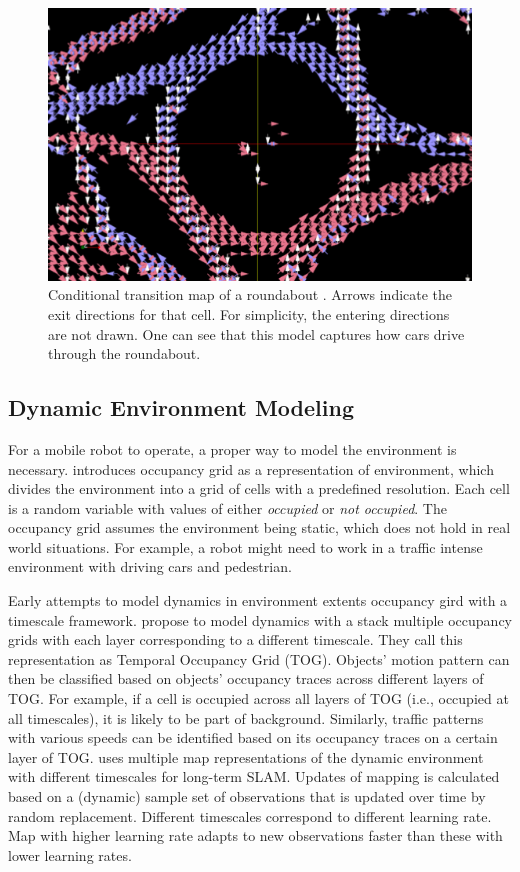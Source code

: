 \begin{figure}[H]
  \centering
    \includegraphics[width=.6\textwidth]{figures/condi_tran_map.png}
    \caption[Conditional transition map of a roundabout.]{Conditional transition map of a roundabout \citep{kucner2013conditional}. Arrows indicate the exit directions for that cell. For simplicity, the entering directions are not drawn. One can see that this model captures how cars drive through the roundabout. }
    \label{fig:condi_tran_map}
\end{figure} 

\subsection{Dynamic Environment Modeling}

For a mobile robot to operate, a proper way to model the environment is necessary. \citet{elfes1989using} introduces occupancy grid as a representation of environment, which divides the environment into a grid of cells with a predefined resolution. Each cell is a random variable with values of either \textit{occupied} or \textit{not occupied}. The occupancy grid assumes the environment being static, which does not hold in real world situations. For example, a robot might need to work in a traffic intense environment with driving cars and pedestrian. 

Early attempts to model dynamics in environment extents occupancy gird with a timescale framework. \citet{arbuckle2002temporal} propose to model dynamics with a stack multiple occupancy grids with each layer corresponding to a different timescale. They call this representation as Temporal Occupancy Grid (TOG). Objects' motion pattern can then be classified based on objects' occupancy traces across different layers of TOG. For example, if a cell is occupied across all layers of TOG (i.e., occupied at all timescales), it is likely to be part of background. Similarly, traffic patterns with various speeds can be identified based on its occupancy traces on a certain layer of TOG. \citet{biber2009experimental} uses multiple map representations of the dynamic environment with different timescales for long-term SLAM. Updates of mapping is calculated based on a (dynamic) sample set of observations that is updated over time by random replacement. Different timescales correspond to different learning rate. Map with higher learning rate adapts to new observations faster than these with lower learning rates.

